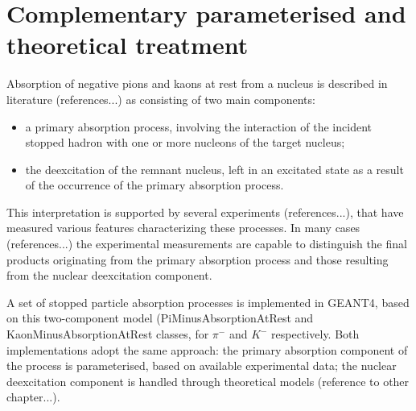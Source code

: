 \section{Complementary parameterised and theoretical treatment}

Absorption of negative pions and kaons at rest from a nucleus 
is described in literature
(references...) 
as consisting of two main components:
\begin{itemize}
\item a primary absorption process, involving the interaction of the
incident stopped hadron with one or more nucleons of the target nucleus;
\item the deexcitation of the remnant nucleus, left in an excitated 
state as a result of the occurrence of the primary absorption process.
\end{itemize}

This interpretation is supported by several experiments
(references...),
that have measured various features characterizing these processes.
In many cases 
(references...)
the experimental measurements are capable to distinguish the final
products originating from the primary absorption process and those 
resulting from the nuclear deexcitation component.

A set of stopped particle absorption processes is implemented in GEANT4,
based on this two-component model (PiMinusAbsorptionAtRest and 
KaonMinusAbsorptionAtRest classes, for $\pi^{-}$ and $K^{-}$ respectively.
Both implementations adopt the same approach:
the primary absorption component of the process is parameterised,
based on available experimental data; 
the nuclear deexcitation component is handled through theoretical models
(reference to other chapter...).

